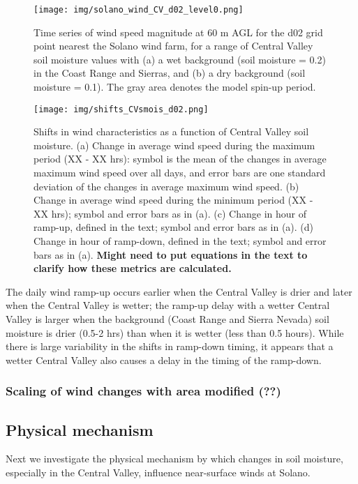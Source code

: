 \begin{figure}[here]
\texttt{[image: img/solano\_wind\_CV\_d02\_level0.png]}
\caption{Time series of wind speed magnitude at 60 m AGL for the d02 grid point nearest the Solano wind farm, for a range of Central Valley soil moisture values with (a) a wet background (soil moisture = 0.2) in the Coast Range and Sierras, and (b) a dry background (soil moisture = 0.1).  The gray area denotes the model spin-up period.}
\label{fig:windSol_TseriesWindCV}
\end{figure}

\begin{figure}[here]
\texttt{[image: img/shifts\_CVsmois\_d02.png]}
\caption{Shifts in wind characteristics as a function of Central Valley soil moisture.  (a) Change in average wind speed during the maximum period (XX - XX hrs): symbol is the mean of the changes in average maximum wind speed over all days, and error bars are one standard deviation of the changes in average maximum wind speed.  (b) Change in average wind speed during the minimum period (XX - XX hrs); symbol and error bars as in (a).  (c) Change in hour of ramp-up, defined in the text; symbol and error bars as in (a).  (d) Change in hour of ramp-down, defined in the text; symbol and error bars as in (a).  \textbf{Might need to put equations in the text to clarify how these metrics are calculated.}}
\label{fig:windSol_WindShiftsCV}
\end{figure}

The daily wind ramp-up occurs earlier when the Central Valley is drier and later when the Central Valley is wetter; the ramp-up delay with a wetter Central Valley is larger when the background (Coast Range and Sierra Nevada) soil moisture is drier (0.5-2 hrs) than when it is wetter (less than 0.5 hours).  While there is large variability in the shifts in ramp-down timing, it appears that a wetter Central Valley also causes a delay in the timing of the ramp-down.

\subsubsection{Scaling of wind changes with area modified (??)}

\subsection{Physical mechanism}
\label{subsec:PhysMech}

Next we investigate the physical mechanism by which changes in soil moisture, especially in the Central Valley, influence near-surface winds at Solano.  

